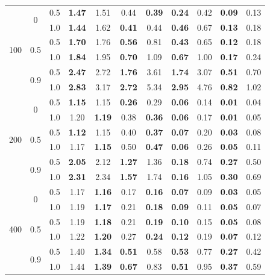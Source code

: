\documentclass[authoryear,review, 12pt]{elsarticle}
\begin{document}
\begin{table}
\begin{tabular}{|ccc|cc|cc|cc|cc|}
  \multirow{6}{*}{100} & \multirow{2}{*}{0} & 0.5 & \textbf{1.47} & 1.51 & 0.44 & \textbf{0.39} & \textbf{0.24} & 0.42 & \textbf{0.09} & 0.13 \\ 
    &  & 1.0 & \textbf{1.44} & 1.62 & \textbf{0.41} & 0.44 & \textbf{0.46} & 0.67 & \textbf{0.13} & 0.18 \\ 
    & \multirow{2}{*}{0.5} & 0.5 & \textbf{1.70} & 1.76 & \textbf{0.56} & 0.81 & \textbf{0.43} & 0.65 & \textbf{0.12} & 0.18 \\ 
    &  & 1.0 & \textbf{1.84} & 1.95 & \textbf{0.70} & 1.09 & \textbf{0.67} & 1.00 & \textbf{0.17} & 0.24 \\ 
    & \multirow{2}{*}{0.9} & 0.5 & \textbf{2.47} & 2.72 & \textbf{1.76} & 3.61 & \textbf{1.74} & 3.07 & \textbf{0.51} & 0.70 \\ 
    &  & 1.0 & \textbf{2.83} & 3.17 & \textbf{2.72} & 5.34 & \textbf{2.95} & 4.76 & \textbf{0.82} & 1.02 \\ 
   \hline \multirow{6}{*}{200} & \multirow{2}{*}{0} & 0.5 & \textbf{1.15} & 1.15 & \textbf{0.26} & 0.29 & \textbf{0.06} & 0.14 & \textbf{0.01} & 0.04 \\ 
    &  & 1.0 & 1.20 & \textbf{1.19} & 0.38 & \textbf{0.36} & \textbf{0.06} & 0.17 & \textbf{0.01} & 0.05 \\ 
    & \multirow{2}{*}{0.5} & 0.5 & \textbf{1.12} & 1.15 & 0.40 & \textbf{0.37} & \textbf{0.07} & 0.20 & \textbf{0.03} & 0.08 \\ 
    &  & 1.0 & 1.17 & \textbf{1.15} & 0.50 & \textbf{0.47} & \textbf{0.06} & 0.26 & \textbf{0.05} & 0.11 \\ 
    & \multirow{2}{*}{0.9} & 0.5 & \textbf{2.05} & 2.12 & \textbf{1.27} & 1.36 & \textbf{0.18} & 0.74 & \textbf{0.27} & 0.50 \\ 
    &  & 1.0 & \textbf{2.31} & 2.34 & \textbf{1.57} & 1.74 & \textbf{0.16} & 1.05 & \textbf{0.30} & 0.69 \\ 
   \hline \multirow{6}{*}{400} & \multirow{2}{*}{0} & 0.5 & 1.17 & \textbf{1.16} & 0.17 & \textbf{0.16} & \textbf{0.07} & 0.09 & \textbf{0.03} & 0.05 \\ 
    &  & 1.0 & 1.19 & \textbf{1.17} & 0.21 & \textbf{0.18} & \textbf{0.09} & 0.11 & \textbf{0.05} & 0.07 \\ 
    & \multirow{2}{*}{0.5} & 0.5 & 1.19 & \textbf{1.18} & 0.21 & \textbf{0.19} & \textbf{0.10} & 0.15 & \textbf{0.05} & 0.08 \\ 
    &  & 1.0 & 1.22 & \textbf{1.20} & 0.27 & \textbf{0.24} & \textbf{0.12} & 0.19 & \textbf{0.07} & 0.12 \\ 
    & \multirow{2}{*}{0.9} & 0.5 & 1.40 & \textbf{1.34} & \textbf{0.51} & 0.58 & \textbf{0.53} & 0.77 & \textbf{0.27} & 0.42 \\ 
    &  & 1.0 & 1.44 & \textbf{1.39} & \textbf{0.67} & 0.83 & \textbf{0.51} & 0.95 & \textbf{0.37} & 0.59 \\ 
  


\end{tabular}
\end{table}
\end{document}
